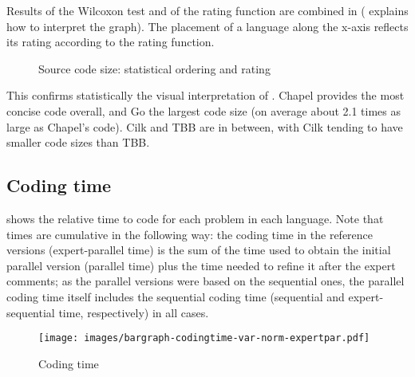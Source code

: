 Results of the Wilcoxon test and of the rating function are combined in  ( explains how to interpret the graph). The placement of a language along the x-axis reflects its rating according to the rating function.

\begin{figure}[htbp]
  \centering
  \vspace{-2ex}
  \caption{Source code size: statistical ordering and rating}
  \label{fig:ord:size}
\end{figure}

This confirms statistically the visual interpretation of . Chapel provides the most concise code overall, and Go the largest code size (on average about 2.1 times as large as Chapel's code). Cilk and TBB are in between, with Cilk tending to have smaller code sizes than TBB.

\subsection{Coding time}
\label{sec:coding-time}

 shows the relative time to code for each problem in each language. Note that times are cumulative in the following way: the coding time in the reference versions (expert-parallel time) is the sum of the time used to obtain the initial parallel version (parallel time) plus the time needed to refine it after the expert comments; as the parallel versions were based on the sequential ones, the parallel coding time itself includes the sequential coding time (sequential and expert-sequential time, respectively) in all cases. 

\begin{figure}[htbp]
  \centering
  \texttt{[image: images/bargraph-codingtime-var-norm-expertpar.pdf]}
  \caption{Coding time}
  \label{fig:time}
\end{figure}


